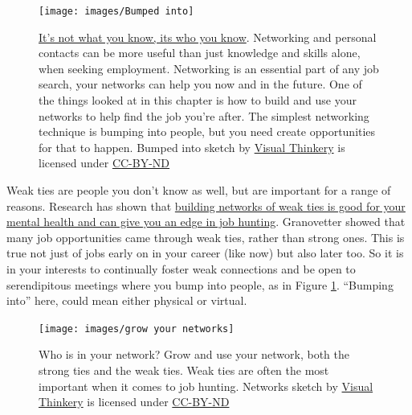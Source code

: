 \documentclass[
]{book}
\begin{document}
\begin{figure}

{\centering \texttt{[image: images/Bumped into]} 

}

\caption{\href{https://en.wiktionary.org/wiki/it\%27s_not_what_you_know_but_who_you_know}{It's not what you know, its who you know}. Networking and personal contacts can be more useful than just knowledge and skills alone, when seeking employment. Networking is an essential part of any job search, your networks can help you now and in the future. One of the things looked at in this chapter is how to build and use your networks to help find the job you're after. The simplest networking technique is bumping into people, but you need create opportunities for that to happen. Bumped into sketch by \href{https://visualthinkery.com/}{Visual Thinkery} is licensed under \href{https://creativecommons.org/licenses/by-nd/4.0/}{CC-BY-ND}}\label{fig:bumped-fig}
\end{figure}



Weak ties are people you don't know as well, but are important for a range of reasons. Research has shown that \href{https://www.bbc.com/worklife/article/20200701-why-your-weak-tie-friendships-may-mean-more-than-you-think}{building networks of weak ties is good for your mental health and can give you an edge in job hunting}. \citep{weakties} Granovetter showed that many job opportunities came through weak ties, rather than strong ones. This is true not just of jobs early on in your career (like now) but also later too. So it is in your interests to continually foster weak connections and be open to serendipitous meetings where you bump into people, as in Figure \ref{fig:bumped-fig}. ``Bumping into'' here, could mean either physical or virtual.

\begin{figure}

{\centering \texttt{[image: images/grow your networks]} 

}

\caption{Who is in your network? Grow and use your network, both the strong ties and the weak ties. Weak ties are often the most important when it comes to job hunting. Networks sketch by \href{https://visualthinkery.com/}{Visual Thinkery} is licensed under \href{https://creativecommons.org/licenses/by-nd/4.0/}{CC-BY-ND}}\label{fig:net-fig}
\end{figure}
\end{document}
